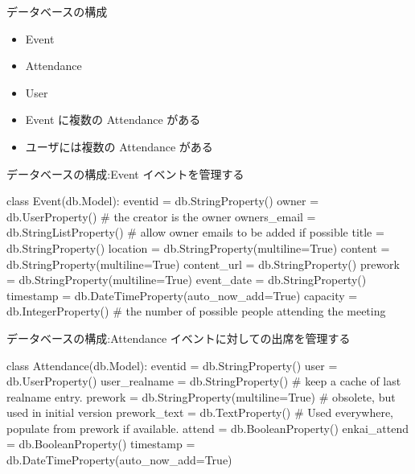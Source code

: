 \begin{frame}{データベースの構成}
\begin{minipage}{0.4\hsize}
 \begin{itemize}
 \item Event
 \item Attendance
 \item User
 \end{itemize}
\end{minipage}
\begin{minipage}{0.5\hsize}
\begin{itemize}
 \item Event に複数の Attendance がある
 \item ユーザには複数の Attendance がある
\end{itemize}
\end{minipage}
\end{frame}


\begin{frame}[containsverbatim]{データベースの構成:Event}
イベントを管理する

\begin{commandline}
 class Event(db.Model):
    eventid = db.StringProperty()
    owner = db.UserProperty() # the creator is the owner
    owners_email = db.StringListProperty() # allow owner emails to be added if possible
    title = db.StringProperty()
    location = db.StringProperty(multiline=True)
    content = db.StringProperty(multiline=True)
    content_url = db.StringProperty()
    prework = db.StringProperty(multiline=True)
    event_date = db.StringProperty()
    timestamp = db.DateTimeProperty(auto_now_add=True)
    capacity = db.IntegerProperty() # the number of possible people attending the meeting
\end{commandline}
\end{frame}

\begin{frame}[containsverbatim]{データベースの構成:Attendance}
イベントに対しての出席を管理する

\begin{commandline}
class Attendance(db.Model):
    eventid = db.StringProperty()
    user = db.UserProperty()
    user_realname = db.StringProperty() # keep a cache of last realname entry.
    prework = db.StringProperty(multiline=True) # obsolete, but used in initial version
    prework_text = db.TextProperty() # Used everywhere, populate from prework if available.
    attend = db.BooleanProperty()
    enkai_attend = db.BooleanProperty()
    timestamp = db.DateTimeProperty(auto_now_add=True)
\end{commandline}
\end{frame}

